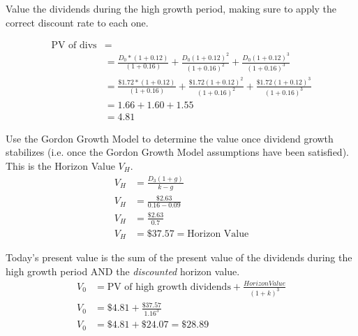 \documentclass[11pt]{article}
\theoremstyle{definition}
\begin{document}
\begin{shaded}
    Value the dividends during the high growth period, making sure to apply the correct discount rate to each one.

    \begin{align*}
    \text{PV of divs} &= \\
     &=\frac{D_0*(1+0.12)}{(1+0.16)} + \frac{D_0(1+0.12)^2}{(1+0.16)^2} + \frac{D_0(1+0.12)^3}{(1+0.16)^3}\\
     &= \frac{\$1.72*(1+0.12)}{(1+0.16)} + \frac{\$1.72(1+0.12)^2}{(1+0.16)^2} + \frac{\$1.72(1+0.12)^3}{(1+0.16)^3}\\
     &= 1.66 + 1.60 + 1.55\\
    &= 4.81
    \end{align*}

    Use the Gordon Growth Model to determine the value once dividend growth stabilizes 
    (i.e. once the Gordon Growth Model assumptions have been satisfied).   
    This is the Horizon Value $V_H$.
    \begin{align*}
    V_H &= \frac{D_3(1+g)}{k-g}\\
    V_H &= \frac{\$2.63}{0.16-0.09}\\
    V_H &= \frac{\$2.63}{0.7}\\
    V_H &= \$37.57 = \text{Horizon Value}
    \end{align*}


    Today's present value is the sum of the present value of the dividends 
    during the high growth period AND the \textit{discounted} horizon value.
    \begin{align*}
    V_0 &= \text{PV of high growth dividends} + \frac{Horizon Value}{(1+k)^3}\\
    V_0 &= \$4.81 + \frac{\$37.57}{1.16^3}\\
    V_0 &= \$4.81 + \$24.07 = \$28.89
    \end{align*}

\end{shaded}
\end{document}
